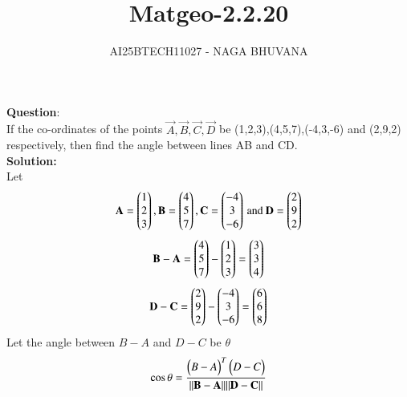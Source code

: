 \documentclass[journal,12pt,onecolumn]{IEEEtran}
\begin{document}
\title{Matgeo-2.2.20}
\author{AI25BTECH11027 - NAGA BHUVANA}
{\let\newpage\relax\maketitle}
\noindent
		\textbf{Question}:\\
        If the co-ordinates of the points $\vec{A},\vec{B},\vec{C},\vec{D}$ be (1,2,3),(4,5,7),(-4,3,-6) and (2,9,2) respectively, then find the angle between lines AB and CD.\\
\textbf{Solution:}\\
Let 
\begin{align}
    \mathbf{A}=\begin{pmatrix}1\\2\\3\end{pmatrix},\mathbf{B}=\begin{pmatrix}4\\5\\7\end{pmatrix},\mathbf{C}=\begin{pmatrix}-4\\3\\-6\end{pmatrix} \, \text{and} \:  \mathbf{D}=\begin{pmatrix}2\\9\\2\end{pmatrix}
\end{align}
\begin{align}
    \mathbf{B-A}=\begin{pmatrix}4\\5\\7\end{pmatrix}-\begin{pmatrix}1\\2\\3\end{pmatrix}=\begin{pmatrix}3\\3\\4\end{pmatrix}
\end{align}	
\begin{align}
    \mathbf{D-C}=\begin{pmatrix}2\\9\\2\end{pmatrix}-\begin{pmatrix}-4\\3\\-6\end{pmatrix}=\begin{pmatrix}6\\6\\8\end{pmatrix}
\end{align}
Let the angle between $B-A$ and $D-C$ be $\theta$
\begin{align}
    \cos{\theta}=\frac{\begin{pmatrix}B-A\end{pmatrix}^T \begin{pmatrix}D-C\end{pmatrix}}{\|\mathbf{B-A}\| \|\mathbf{D-C}\|}
\end{align}
\end{document}
